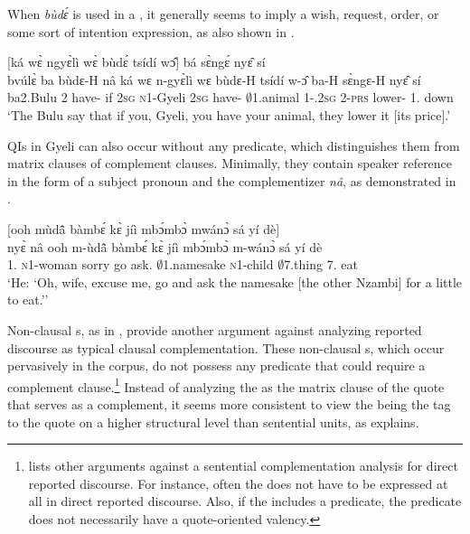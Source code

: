 When {\itshape bùdɛ́} is used in a {\QI}, it generally seems to imply a wish, request, order, or some sort of intention expression, as also shown in .


\ea\label{RS3}
  \glll [bvúlɛ̀ bà bùdɛ́ nâ]\textsubscript{{\QI}} [ká wɛ̀ ngyɛ̀lì wɛ̀ bùdɛ́ tsídí wɔ̂]\textsubscript{{\RD}} bá sɛ̀ngɛ́ nyɛ̂ sí \\
        {\db}bvúlɛ̀ ba bùdɛ-H nâ {\db}ká wɛ n-gyɛ̀lì wɛ bùdɛ-H tsídí w-ɔ̂ ba-H sɛ̀ngɛ-H nyɛ̂ sí \\
          {\db}ba2.Bulu 2 have-{\R} {\COMP} {\db}if 2\textsc{sg} \textsc{n}1-Gyeli 2\textsc{sg} have-{\R} $\emptyset$1.animal 1-{\POSS}.2\textsc{sg} 2-\textsc{prs} lower-{\R} 1.{\OBJ} down   \\
    \trans `The Bulu say that if you, Gyeli, you have your animal, they lower it [its price].'
\z

QIs in Gyeli can also occur without any predicate,  which distinguishes them from matrix clauses of complement clauses. Minimally, they contain speak\-er reference in the form of a subject pronoun and the complementizer {\itshape nâ}, as demonstrated in .


\ea\label{RS4}
  \glll  [nyɛ̀ nâ]\textsubscript{{\QI}} [ooh mùdã̂ bàmbɛ́ kɛ̀ jíì mbɔ́mbɔ̀ mwánɔ̀ sá yí dè]\textsubscript{{\RD}} \\
         {\db}nyɛ̀ nâ {\db}ooh m-ùdã̂ bàmbɛ́ kɛ̀ jíì mbɔ́mbɔ̀ m-wánɔ̀ sá yí dè \\
        {\db}1.{\SBJ} {\COMP} {\db}{\EXCL} \textsc{n}1-woman sorry go ask.{\IMP} $\emptyset$1.namesake \textsc{n}1-child $\emptyset$7.thing 7.{\DEM} eat  \\
    \trans `He: `Oh, wife, excuse me, go and ask the namesake [the other Nzambi] for a little to eat.''
\z

\hspace*{-3.5pt}Non-clausal {\QI}s, as in , provide another argument against analyzing repor\-ted discourse as typical clausal complementation. These non-clausal {\QI}s, which occur pervasively in the corpus, do not possess any predicate that could require a complement clause.\footnote{\citet[226-233]{guldemann2008} lists other arguments against a sentential complementation analysis for direct reported discourse. For instance, often the {\QI} does not have to be expressed at all in direct reported discourse. Also, if the {\QI} includes a predicate, the predicate does not  necessarily have a quote-oriented valency.} Instead of analyzing the {\QI} as the matrix clause of the quote that serves as a complement, it seems more consistent to view
 the {\QI} being the tag to the quote on a higher structural level than sentential units, as \citet[231]{guldemann2008} explains.

